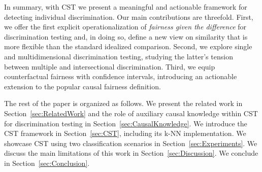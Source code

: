 In summary,
with CST we present a meaningful and actionable framework for detecting individual discrimination.
Our main contributions are threefold.
%
First, we offer the first explicit operationalization of \textit{fairness given the difference} for discrimination testing and, in doing so, define a new view on similarity that is more flexible than the standard idealized comparison.
%
Second, we explore single and multidimensional discrimination testing, studying the latter's tension between multiple and intersectional discrimination.
%
Third, we equip counterfactual fairness with confidence intervals, introducing an actionable extension to the popular causal fairness definition.

The rest of the paper is organized as follows.
We present the related work in Section~\ref{sec:RelatedWork} and the role of auxiliary causal knowledge within CST for discrimination testing in Section~\ref{sec:CausalKnowledge}.
We introduce the CST framework in Section~\ref{sec:CST}, including its k-NN implementation.
We showcase CST using two classification scenarios in Section~\ref{sec:Experiments}.
We discuss the main limitations of this work in Section~\ref{sec:Discussion}.
We conclude in Section~\ref{sec:Conclusion}.

%
%

